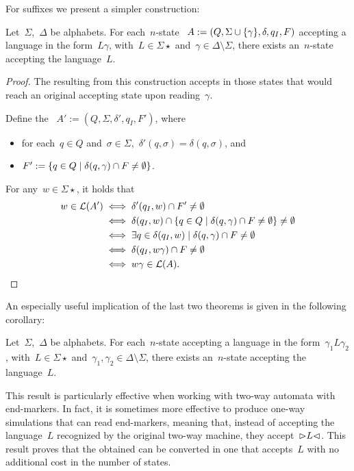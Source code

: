 For suffixes we present a simpler construction:
\begin{thrm}
	Let~$\Sigma$,~$\Delta$ be alphabets.
	For each~$n$-state \ONFA~$A:=(Q,\Sigma\cup\{\gamma\},\delta,q_I,F)$ accepting a language in the form~$L\gamma$, with~$L\in\Sigma\star$ and~$\gamma\in\Delta\setminus\Sigma$, there exists an~$n$-state \ONFA accepting the language~$L$.
\end{thrm}
\begin{proof}
	The \ONFA resulting from this construction accepts in those states that would reach an original accepting state upon reading~$\gamma$.

	Define the \ONFA~$A':=(Q,\Sigma,\delta',q_I,F')$, where
	\begin{itemize}
		\item for each~$q\in Q$ and~$\sigma\in\Sigma$,~$\delta'(q,\sigma)=\delta(q,\sigma)$, and
		\item $F':=\{q\in Q\mid \delta(q,\gamma)\cap F\ne\emptyset\}$.
	\end{itemize}

	For any~$w\in\Sigma\star$, it holds that
	\begin{align*}
		w\in\mathcal L(A') & \iff \delta'(q_I,w)\cap F'\ne\emptyset                                                 \\
		                 & \iff \delta(q_I,w)\cap \{q\in Q\mid \delta(q,\gamma)\cap F\ne\emptyset\}\ne\emptyset \\
		                 & \iff \exists q\in\delta(q_I,w)\mid \delta(q,\gamma)\cap F\ne\emptyset                  \\
		                 & \iff \delta(q_I,w\gamma)\cap F\ne\emptyset                                             \\
		                 & \iff w\gamma\in\mathcal L(A) \text. \qedhere
	\end{align*}
\end{proof}

An especially useful implication of the last two theorems is given in the following corollary:
\begin{coro}
	Let~$\Sigma$,~$\Delta$ be alphabets.
	For each~$n$-state \ONFA accepting a language in the form~$\gamma_1 L\gamma_2$, with~$L\in\Sigma\star$ and~$\gamma_1,\gamma_2\in\Delta\setminus\Sigma$, there exists an~$n$-state \ONFA accepting the language~$L$.
\end{coro}
This result is particularly effective when working with two-way automata with end-markers.
In fact, it is sometimes more effective to produce one-way simulations that can read end-markers, meaning that, instead of accepting the language~$L$ recognized by the original two-way machine, they accept~$\rhd L\lhd$.
This result proves that the obtained \ONFA can be converted in one that accepts~$L$ with no additional cost in the number of states.



